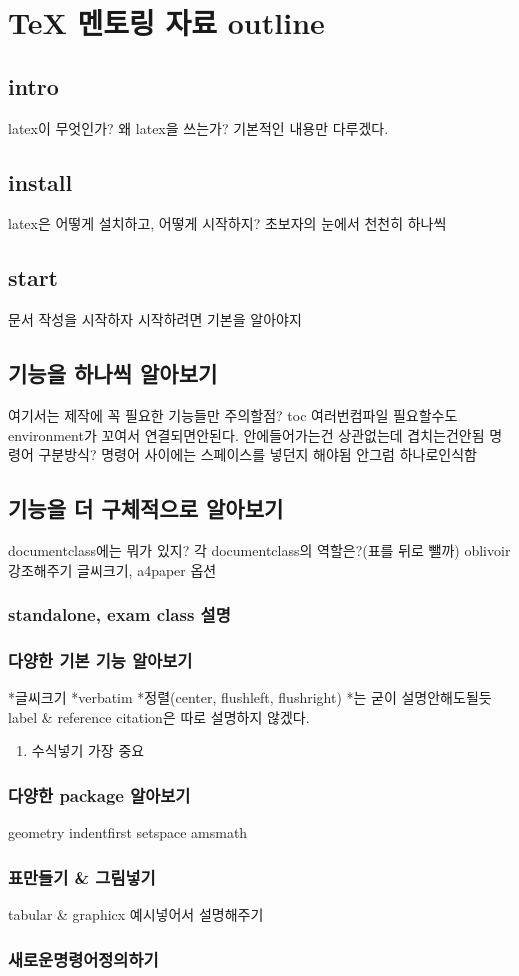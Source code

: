 \documentclass[11pt]{article}
\date{\today}
\title{}
\begin{document}
\tableofcontents

\section{\TeX{} 멘토링 자료 outline}
\label{sec:orgb007ac3}
\subsection{intro}
\label{sec:org2de5bbd}
latex이 무엇인가?
왜 latex을 쓰는가?
기본적인 내용만 다루겠다.
\subsection{install}
\label{sec:org8195316}
latex은 어떻게 설치하고, 어떻게 시작하지?
초보자의 눈에서 천천히 하나씩
\subsection{start}
\label{sec:org9f622fe}
문서 작성을 시작하자
시작하려면 기본을 알아야지
\subsection{기능을 하나씩 알아보기}
\label{sec:org38cb18f}
여기서는 제작에 꼭 필요한 기능들만
주의할점? toc 여러번컴파일 필요할수도
environment가 꼬여서 연결되면안된다. 안에들어가는건 상관없는데 겹치는건안됨
명령어 구분방식?
명령어 사이에는 스페이스를 넣던지 해야됨 안그럼 하나로인식함

\subsection{기능을 더 구체적으로 알아보기}
\label{sec:orgfe24346}
documentclass에는 뭐가 있지? 각 documentclass의 역할은?(표를 뒤로 뺄까)
oblivoir 강조해주기
글씨크기, a4paper 옵션
\subsubsection{standalone, exam class 설명}
\label{sec:org48d3943}
\subsubsection{다양한 기본 기능 알아보기}
\label{sec:org7b4c559}
*글씨크기
*verbatim
*정렬(center, flushleft, flushright)
*는 굳이 설명안해도될듯
label \& reference
citation은 따로 설명하지 않겠다.
\begin{enumerate}
\item 수식넣기
\label{sec:org671eb64}
가장 중요
\end{enumerate}
\subsubsection{다양한 package 알아보기}
\label{sec:org21b3205}
geometry
indentfirst
setspace
amsmath
\subsubsection{표만들기 \& 그림넣기}
\label{sec:org6c6e510}
tabular \& graphicx
예시넣어서 설명해주기
\subsubsection{새로운명령어정의하기}
\label{sec:org4d53b5b}
\end{document}

